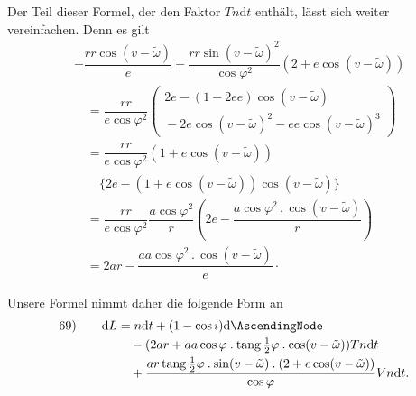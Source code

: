 \par Der Teil dieser Formel, der den Faktor \(Tn\mathrm{d}t\) enthält, lässt sich weiter vereinfachen. Denn es gilt
\[
\begin{aligned}
&-\dfrac{rr\cos(v-\tilde\omega)}{e}+\dfrac{rr\sin(v-\tilde\omega)^2}{\cos\varphi^2}(2+e\cos(v-\tilde\omega))\\[4pt]
&\quad=\dfrac{rr}{e\cos\varphi^2}\left(\begin{aligned}2e-(1-2ee)\cos(v-\tilde\omega)\\
{}-2e\cos(v-\tilde\omega)^2-ee\cos(v-\tilde\omega)^3\end{aligned}\right)\\[4pt]
&\quad=\dfrac{rr}{e\cos\varphi^2}(1+e\cos(v-\tilde\omega))\\
&\qquad\{2e-(1+e\cos(v-\tilde\omega))\cos(v-\tilde\omega)\}\\[4pt]
&\quad=\dfrac{rr}{e\cos\varphi^2}\dfrac{a\cos\varphi^2}{r}\left(2e-\dfrac{a\cos\varphi^2\mathbin{.}\cos(v-\tilde\omega)}{r}\right)\\[4pt]
&\quad=2ar-\dfrac{aa\cos\varphi^2\mathbin{.}\cos(v-\tilde\omega)}{e}\mathpunct{\cdot}
\end{aligned}
\]
\par Unsere Formel nimmt daher die folgende Form an
\[
\begin{array}{rl}
69)\quad&\begin{aligned}[t]\mathrm{d}L&=n\mathrm{d}t+(1-\cos i)\mathrm{d}\AscendingNode\\
&\quad-(2ar+aa\cos\varphi\mathbin{.}\operatorname{tang}\tfrac12\varphi\mathbin{.}\cos(v-\tilde\omega))Tn\mathrm{d}t\\
&\quad+\dfrac{ar\operatorname{tang}\tfrac12\varphi\mathbin{.}\sin(v-\tilde\omega)\mathbin{.}(2+e\cos(v-\tilde\omega))}{\cos\varphi}Vn\mathrm{d}t.\end{aligned}
\end{array}
\]
